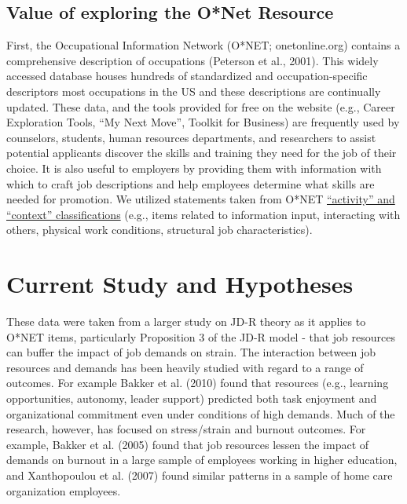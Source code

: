 \documentclass[
  man]{apa6}
\begin{document}
\hypertarget{value-of-exploring-the-onet-resource}{%
\subsection{Value of exploring the O*Net Resource}\label{value-of-exploring-the-onet-resource}}

First, the Occupational Information Network (O*NET; onetonline.org) contains a comprehensive description of occupations (Peterson et al., 2001). This widely accessed database houses hundreds of standardized and occupation-specific descriptors most occupations in the US and these descriptions are continually updated. These data, and the tools provided for free on the website (e.g., Career Exploration Tools, ``My Next Move'', Toolkit for Business) are frequently used by counselors, students, human resources departments, and researchers to assist potential applicants discover the skills and training they need for the job of their choice. It is also useful to employers by providing them with information with which to craft job descriptions and help employees determine what skills are needed for promotion. We utilized statements taken from O*NET \href{https://www.O*NETonline.org/find/descriptor/result/4.A.1.b.3}{``activity'' and ``context'' classifications} (e.g., items related to information input, interacting with others, physical work conditions, structural job characteristics).

\hypertarget{current-study-and-hypotheses}{%
\section{Current Study and Hypotheses}\label{current-study-and-hypotheses}}

These data were taken from a larger study on JD-R theory as it applies to O*NET items, particularly Proposition 3 of the JD-R model - that job resources can buffer the impact of job demands on strain. The interaction between job resources and demands has been heavily studied with regard to a range of outcomes. For example Bakker et al. (2010) found that resources (e.g., learning opportunities, autonomy, leader support) predicted both task enjoyment and organizational commitment even under conditions of high demands. Much of the research, however, has focused on stress/strain and burnout outcomes. For example, Bakker et al. (2005) found that job resources lessen the impact of demands on burnout in a large sample of employees working in higher education, and Xanthopoulou et al. (2007) found similar patterns in a sample of home care organization employees.
\end{document}
